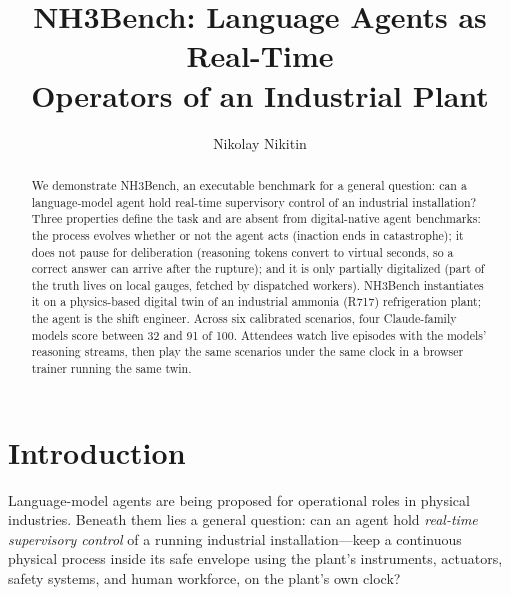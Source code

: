 \documentclass[letterpaper]{article} %
\title{NH3Bench: Language Agents as Real-Time\\ Operators of an Industrial Plant}
\author{
    Nikolay Nikitin
}
\begin{document}
\maketitle

\begin{abstract}
We demonstrate NH3Bench, an executable benchmark for a general question: can
a language-model agent hold real-time supervisory control of an industrial
installation? Three properties define the task and are absent from
digital-native agent benchmarks: the process evolves whether or not the
agent acts (inaction ends in catastrophe); it does not pause for
deliberation (reasoning tokens convert to virtual seconds, so a correct
answer can arrive after the rupture); and it is only partially digitalized
(part of the truth lives on local gauges, fetched by dispatched workers).
NH3Bench instantiates it on a physics-based digital twin of an industrial
ammonia (R717) refrigeration plant; the agent is the shift engineer. Across
six calibrated scenarios, four Claude-family models score between 32 and 91
of 100. Attendees watch live episodes with the models' reasoning streams,
then play the same scenarios under the same clock in a browser trainer
running the same twin.
\end{abstract}

\section{Introduction}

Language-model agents are being proposed for operational roles in physical
industries. Beneath them lies a general question: can an
agent hold \emph{real-time supervisory control} of a running industrial
installation---keep a continuous physical process inside its safe envelope
using the plant's instruments, actuators, safety systems, and human
workforce, on the plant's own clock?
\end{document}
